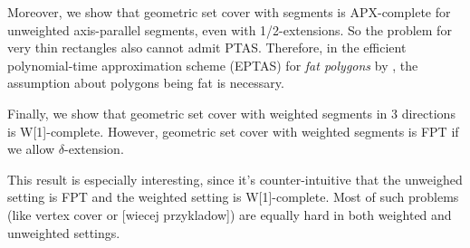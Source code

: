 Moreover, we show that geometric set cover with segments
is APX-complete for unweighted axis-parallel segments,
even with 1/2-extensions.
So the problem for very thin rectangles
also cannot admit PTAS.
Therefore, in the efficient polynomial-time approximation scheme (EPTAS)
for \textit{fat polygons} by \cite{harpeled12},
the assumption about polygons being fat is necessary. 

Finally, we show that geometric set cover with weighted segments in
3 directions is W[1]-complete.
However, geometric set cover with weighted segments is FPT if we allow
$\delta$-extension.

This result is especially interesting,
since it's counter-intuitive that
the unweighed setting is FPT and the weighted
setting is W[1]-complete.
Most of such problems (like vertex cover or [wiecej przykladow])
are equally hard in both weighted and unweighted settings.

